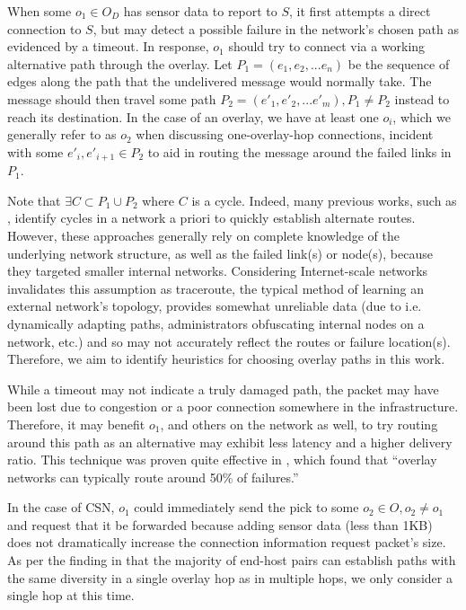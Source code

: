 \documentclass[conference]{IEEEtran}
\begin{document}

When some $o_1 \in O_D$ has sensor data to report to $S$, it first attempts a direct connection to $S$, but may detect a possible failure in the network's chosen path as evidenced by a timeout.
In response, $o_1$ should try to connect via a working alternative path through the overlay.
Let $P_1 = (e_1, e_2, ... e_n)$ be the sequence of edges along the path that the undelivered message would normally take.
The message should then travel some path $P_2 = (e'_1, e'_2, ... e'_m), P_1 \neq P_2$ instead to reach its destination.
In the case of an overlay, we have at least one $o_i$, which we generally refer to as $o_2$ when discussing one-overlay-hop connections, incident with some $e'_i, e'_{i+1} \in P_2$ to aid in routing the message around the failed links in $P_1$.

Note that $\exists C \subset P_1 \cup P_2$ where $C$ is a cycle.
Indeed, many previous works, such as \cite{kiyoshi, pcycles}, identify cycles in a network a priori to quickly establish alternate routes.
However, these approaches generally rely on complete knowledge of the underlying network structure, as well as the failed link(s) or node(s), because they targeted smaller internal networks.
Considering Internet-scale networks invalidates this assumption as traceroute, the typical method of learning an external network's topology, provides somewhat unreliable data (due to i.e. dynamically adapting paths, administrators obfuscating internal nodes on a network, etc.) and so may not accurately reflect the routes or failure location(s).
Therefore, we aim to identify heuristics for choosing overlay paths in this work.

While a timeout may not indicate a truly damaged path, the packet may have been lost due to congestion or a poor connection somewhere in the infrastructure.
Therefore, it may benefit $o_1$, and others on the network as well, to try routing around this path as an alternative may exhibit less latency and a higher delivery ratio.
This technique was proven quite effective in \cite{reactive_routing}, which found that ``overlay networks can typically route around 50\% of failures.''

In the case of CSN, $o_1$ could immediately send the pick to some $o_2 \in O,o_2 \neq o_1$ and request that it be forwarded because adding sensor data (less than 1KB) does not dramatically increase the connection information request packet's size.
As per the finding in \cite{topology_aware_overlay} that the majority of end-host pairs can establish paths with the same diversity in a single overlay hop as in multiple hops, we only consider a single hop at this time.
\end{document}
